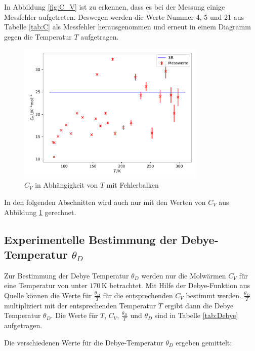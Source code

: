 In Abbildung \ref{fig:C_V} ist zu erkennen, dass es bei der Messung einige Messfehler aufgetreten. Deswegen werden die Werte Nummer 4, 5 und 21 aus Tabelle \ref{tab:C} als Messfehler herausgenommen und erneut in einem Diagramm gegen die Temperatur $T$ aufgetragen.

\begin{figure}[H]
    \centering
    \includegraphics[width=0.8\textwidth]{build/C_V_gefiltert.pdf}
    \caption{$C_V$ in Abhängigkeit von $T$ mit Fehlerbalken}
    \label{fig:C_V_gefiltert}
\end{figure}

In den folgenden Abschnitten wird auch nur mit den Werten von $C_V$ aus Abbildung \ref{fig:C_V_gefiltert} gerechnet.

\subsection[Experimentelle Bestimmung der Debye-Temperatur]{Experimentelle Bestimmung der Debye-Temperatur $\theta_D$}
\label{sec:debye_temp}

Zur Bestimmung der Debye Temperatur $\theta_D$ werden nur die Molwärmen $C_V$ für eine Temperatur von unter $170 \, \mathrm{K}$ betrachtet. Mit Hilfe der Debye-Funktion aus Quelle \cite{Anleitung} können die Werte für $\frac{\theta_D}{T}$ für die entsprechenden $C_V$ bestimmt werden. $\frac{\theta_D}{T}$ multipliziert mit der entsprechenden Temperatur $T$ ergibt dann die Debye Temperatur $\theta_D$. Die Werte für $T$, $C_V$, $\frac{\theta_D}{T}$ und $\theta_D$ sind in Tabelle \ref{tab:Debye} aufgetragen.


Die verschiedenen Werte für die Debye-Temperatur $\theta_D$ ergeben gemittelt:

